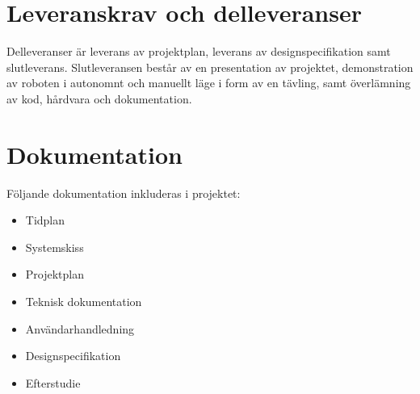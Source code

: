 \documentclass[a4paper,titlepage,12pt]{article}
\begin{document}
	\section{Leveranskrav och delleveranser}
	Delleveranser är leverans av projektplan, leverans av designspecifikation 
	samt slutleverans. Slutleveransen består av en presentation av projektet, 
	demonstration av roboten i autonomnt och manuellt läge i form av en tävling,
	samt överlämning av kod, hårdvara och dokumentation.
	
	\section{Dokumentation}
    Följande dokumentation inkluderas i projektet:
    \begin{itemize}
		\item Tidplan 
		\item Systemskiss 
		\item Projektplan
		\item Teknisk dokumentation 
		\item Användarhandledning 
        \item Designspecifikation
        \item Efterstudie
    \end{itemize}
\end{document}
